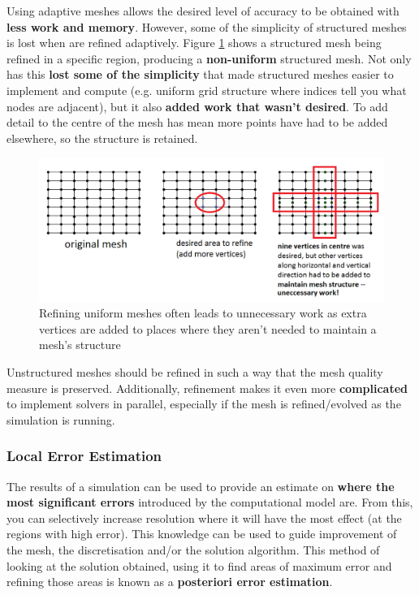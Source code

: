 \documentclass{article}
\begin{document}
Using adaptive meshes allows the desired level of accuracy to be obtained with \textbf{less work and memory}. However, some of the simplicity of structured meshes is lost when are refined adaptively. Figure \ref{fig:local-refinement-structured-mesh} shows a structured mesh being refined in a specific region, producing a \textbf{non-uniform} structured mesh. Not only has this \textbf{lost some of the simplicity} that made structured meshes easier to implement and compute (e.g. uniform grid structure where indices tell you what nodes are adjacent), but it also \textbf{added work that wasn't desired}. To add detail to the centre of the mesh has mean more points have had to be added elsewhere, so the structure is retained.

\begin{figure}
	\centering
	\includegraphics[scale=0.5]{figures/uniform-mesh-refinement.png}
	\caption{Refining uniform meshes often leads to unnecessary work as extra vertices are added to places where they aren't needed to maintain a mesh's structure}
	\label{fig:local-refinement-structured-mesh}
\end{figure}

Unstructured meshes should be refined in such a way that the mesh quality measure is preserved. Additionally, refinement makes it even more \textbf{complicated} to implement solvers in parallel, especially if the mesh is refined/evolved as the simulation is running.

\subsubsection{Local Error Estimation}

The results of a simulation can be used to provide an estimate on \textbf{where the most significant errors} introduced by the computational model are. From this, you can selectively increase resolution where it will have the most effect (at the regions with high error). This knowledge can be used to guide improvement of the mesh, the discretisation and/or the solution algorithm. This method of looking at the solution obtained, using it to find areas of maximum error and refining those areas is known as a \textbf{posteriori error estimation}.
\end{document}
